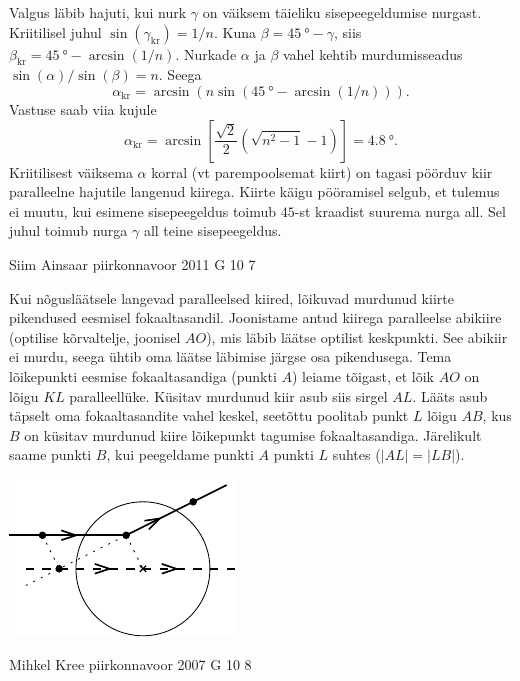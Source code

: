 \documentclass[11pt]{article}
\begin{document}
{{Valgus läbib hajuti, kui nurk $\gamma$ on väiksem täieliku sisepeegeldumise nurgast. Kriitilisel juhul $\sin(\gamma_\mathrm{kr})=1/n$. Kuna $\beta=\SI{45}{\degree}-\gamma$, siis $\beta_\mathrm{kr} = \SI{45}{\degree}-\arcsin(1/n)$. Nurkade $\alpha$ ja $\beta$ vahel kehtib murdumisseadus $\sin(\alpha)/\sin(\beta)=n$. Seega
\[
\alpha_\mathrm{kr}=\arcsin(n\sin(\SI{45}{\degree}-\arcsin(1/n))).
\]
Vastuse saab viia kujule
\[
\alpha_\mathrm{kr}=\arcsin\left[\frac{\sqrt2}{2}(\sqrt{n^2-1}-1)\right] = \SI{4.8}{\degree}.
\]
Kriitilisest väiksema $\alpha$ korral (vt parempoolsemat kiirt) on tagasi pöörduv kiir paralleelne hajutile langenud kiirega. Kiirte käigu pööramisel selgub, et tulemus ei muutu, kui esimene sisepeegeldus toimub $45$-st kraadist suurema nurga all. Sel juhul toimub nurga $\gamma$ all teine sisepeegeldus.
\fi
}

{Siim Ainsaar} %
{piirkonnavoor} %
{2011} %
{G 10} %
{7} %
{

\ifSolution
Kui nõgusläätsele langevad paralleelsed kiired, lõikuvad
murdunud kiirte pikendused eesmisel fokaaltasandil. Joonistame antud kiirega paralleelse abikiire (optilise kõrvaltelje, joonisel $AO$), mis läbib läätse optilist keskpunkti. See abikiir ei murdu, seega ühtib oma läätse läbimise järgse osa pikendusega. Tema lõikepunkti eesmise fokaaltasandiga (punkti $A$) leiame tõigast, et lõik $AO$ on lõigu
$KL$ paralleellüke. Küsitav murdunud kiir asub siis sirgel $AL$. Lääts asub täpselt oma
fokaaltasandite vahel keskel, seetõttu poolitab punkt $L$ lõigu $AB$, kus $B$ on küsitav murdunud kiire lõikepunkt tagumise fokaaltasandiga. Järelikult saame punkti $B$, kui peegeldame punkti $A$ punkti $L$ suhtes ($|AL| = |LB|$).

\begin{center}
	\includegraphics[width=0.5\linewidth]{2011-v2g-10-lah}
\end{center}
\fi
}

{Mihkel Kree} %
{piirkonnavoor} %
{2007} %
{G 10} %
{8} %
{

}}
\end{document}
